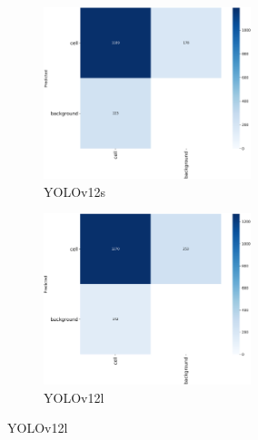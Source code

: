 \documentclass[12pt,a4paper,onecolumn,oneside]{report}
\begin{document}
\begin{figure}[H]
  \vspace{0.1cm}
  \begin{subfigure}[b]{0.45\textwidth}
    \centering
    \includegraphics[height=5cm]{figuras/resultados experimentacion/yolov12s/test/confusion_matrix.png}
    \vspace{-0.3cm}
    \caption{\footnotesize YOLOv12s}
    \label{fig:confusion_yolov12s_test}
  \end{subfigure}
  \hfill
  \begin{subfigure}[b]{0.45\textwidth}
    \centering
    \includegraphics[height=5cm]{figuras/resultados experimentacion/yolov12l/test/confusion_matrix.png}
    \vspace{-0.3cm}
    \caption{\footnotesize YOLOv12l}
    \label{fig:confusion_yolov12l_test}
  \end{subfigure}
  

\end{figure}
\end{document}
